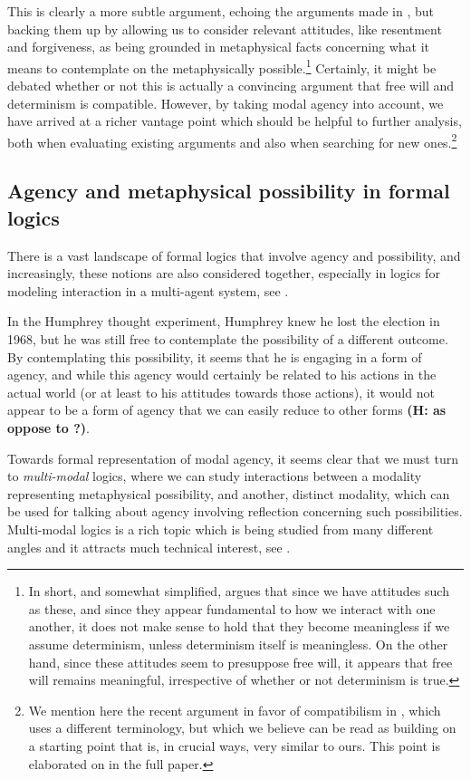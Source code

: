 \documentclass{article}
\newcommand{\hannah}[1]{\textbf{\textcolor{OliveGreen}{(H: #1)}}}
\begin{document}
This is clearly a more subtle argument, echoing the arguments made in \cite{strawsonfree}, but backing them up by allowing us to consider relevant attitudes, like resentment and forgiveness, as being grounded in metaphysical facts concerning what it means to contemplate on the metaphysically possible.\footnote{In short, and somewhat simplified, \cite{strawsonfree} argues that since we have attitudes such as these, and since they appear fundamental to how we interact with one another, it does not make sense to hold that they become meaningless if we assume determinism, unless determinism itself is meaningless. On the other hand, since these attitudes seem to presuppose free will, it appears that free will remains meaningful, irrespective of whether or not determinism is true.} Certainly, it might be debated whether or not this is actually a convincing argument that free will and determinism is compatible. However, by taking modal agency into account, we have arrived at a richer vantage point which should be 
helpful to further analysis, both when evaluating existing arguments and also when searching for new ones.\footnote{We mention here the recent argument in favor of compatibilism in \cite{Listfree}, which uses a different terminology, but which we believe can be read as building on a starting point that is, in crucial ways, very similar to ours. This point is elaborated on in the full paper.}

\subsection*{Agency and metaphysical possibility in formal logics}

There is a vast landscape of formal logics that involve agency and possibility, and increasingly, these notions are also considered together, especially in logics for modeling interaction in a multi-agent system, see \cite{IMAS,Benthem}.

In the Humphrey thought experiment, Humphrey knew he lost the election in 1968, but he was still free to contemplate the possibility of a different outcome. By contemplating this possibility, it seems that he is engaging in a form of agency, and while this agency would certainly be related to his actions in the actual world (or at least to his attitudes towards those actions), it would not appear to be a form of agency that we can easily reduce to other forms \hannah{as oppose to ?}.

Towards formal representation of modal agency, it seems clear that we must turn to \emph{multi-modal} logics, where we can study interactions between a modality representing metaphysical possibility, and another, distinct modality, which can be used for talking about agency involving reflection concerning such possibilities. Multi-modal logics is a rich topic which is being studied from many different angles and it attracts much technical interest, see \cite{multimod}. 
\end{document}
